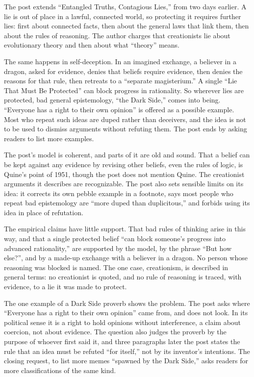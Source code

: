 \begin{afterword}
\summaryhead

The post extends ``Entangled Truths, Contagious Lies,'' from two days earlier. A lie is out of place in a lawful, connected world, so protecting it requires further lies: first about connected facts, then about the general laws that link them, then about the rules of reasoning. The author charges that creationists lie about evolutionary theory and then about what ``theory'' means.

The same happens in self-deception. In an imagined exchange, a believer in a dragon, asked for evidence, denies that beliefs require evidence, then denies the reasons for that rule, then retreats to a ``separate magisterium.'' A single ``Lie That Must Be Protected'' can block progress in rationality. So wherever lies are protected, bad general epistemology, ``the Dark Side,'' comes into being. ``Everyone has a right to their own opinion'' is offered as a possible example. Most who repeat such ideas are duped rather than deceivers, and the idea is not to be used to dismiss arguments without refuting them. The post ends by asking readers to list more examples.

\responsehead

The post's model is coherent, and parts of it are old and sound. That a belief can be kept against any evidence by revising other beliefs, even the rules of logic, is Quine's point of 1951, though the post does not mention Quine. The creationist arguments it describes are recognizable. The post also sets sensible limits on its idea: it corrects its own pebble example in a footnote, says most people who repeat bad epistemology are ``more duped than duplicitous,'' and forbids using its idea in place of refutation.

The empirical claims have little support. That bad rules of thinking arise in this way, and that a single protected belief ``can block someone's progress into advanced rationality,'' are supported by the model, by the phrase ``But how else?'', and by a made-up exchange with a believer in a dragon. No person whose reasoning was blocked is named. The one case, creationism, is described in general terms: no creationist is quoted, and no rule of reasoning is traced, with evidence, to a lie it was made to protect.

The one example of a Dark Side proverb shows the problem. The post asks where ``Everyone has a right to their own opinion'' came from, and does not look. In its political sense it is a right to hold opinions without interference, a claim about coercion, not about evidence. The question also judges the proverb by the purpose of whoever first said it, and three paragraphs later the post states the rule that an idea must be refuted ``for itself,'' not by its inventor's intentions. The closing request, to list more memes ``spawned by the Dark Side,'' asks readers for more classifications of the same kind.


\end{afterword}
